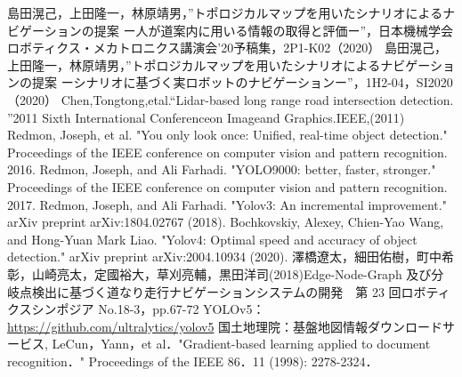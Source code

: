 \documentclass[../main]{subfiles}
\begin{document}
\begin{thebibliography}{99}
 島田滉己，上田隆一，林原靖男，”トポロジカルマップを用いたシナリオによるナビゲーションの提案 ー人が道案内に用いる情報の取得と評価ー”，日本機械学会ロボティクス・メカトロニクス講演会'20予稿集，2P1-K02（2020）
 島田滉己，上田隆一，林原靖男，”トポロジカルマップを用いたシナリオによるナビゲーションの提案 ーシナリオに基づく実ロボットのナビゲーションー”，1H2-04，SI2020（2020）
 Chen,Tongtong,etal.“Lidar-based long range road intersection detection. ”2011 Sixth International Conferenceon Imageand Graphics.IEEE,(2011)
 Redmon, Joseph, et al. "You only look once: Unified, real-time object detection." Proceedings of the IEEE conference on computer vision and pattern recognition. 2016.
 Redmon, Joseph, and Ali Farhadi. "YOLO9000: better, faster, stronger." Proceedings of the IEEE conference on computer vision and pattern recognition. 2017.
 Redmon, Joseph, and Ali Farhadi. "Yolov3: An incremental improvement." arXiv preprint arXiv:1804.02767 (2018).
 Bochkovskiy, Alexey, Chien-Yao Wang, and Hong-Yuan Mark Liao. "Yolov4: Optimal speed and accuracy of object detection." arXiv preprint arXiv:2004.10934 (2020).
 澤橋遼太，細田佑樹，町中希彰，山崎亮太，定國裕大，草刈亮輔，黒田洋司(2018)Edge-Node-Graph 及び分岐点検出に基づく道なり走行ナビゲーションシステムの開発　第 23 回ロボティクスシンポジア No.18-3，pp.67-72
 YOLOv5：\url{https://github.com/ultralytics/yolov5}
 国土地理院：基盤地図情報ダウンロードサービス, %
 LeCun，Yann，et al．"Gradient-based learning applied to document recognition．" Proceedings of the IEEE 86．11 (1998): 2278-2324．
\end{thebibliography}
\end{document}

